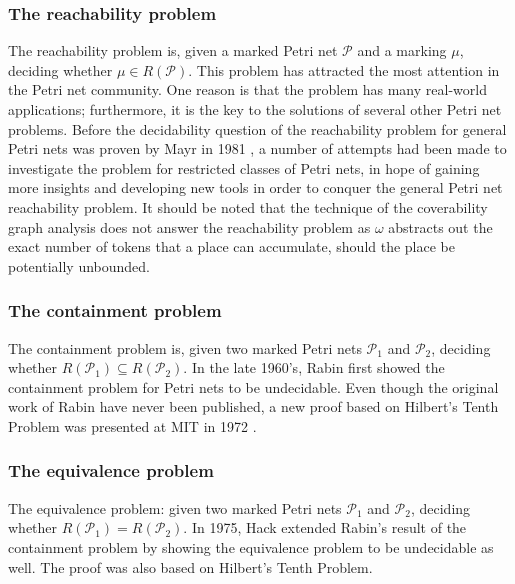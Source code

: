 \subsubsection{The reachability problem} %
\label{ssub:the_reachability_problem}
  The  reachability problem is, given a marked Petri net $\mathcal P$ and a marking $\mu$, deciding whether $\mu\in R(\mathcal P)$. This problem has attracted the most attention in the Petri net community. One reason is that the problem has many real-world applications; furthermore, it is the key to the solutions of several other Petri net problems. Before the decidability question of the reachability problem for general Petri nets was proven by Mayr in 1981 \cite{Mayr81PetriNetReachability}, a number of attempts had been made to investigate the problem for restricted classes of Petri nets, in hope of gaining more insights and developing new tools in order to conquer the general Petri net reachability problem. It should be noted that the technique of the coverability graph analysis does not answer the reachability problem as $\omega$ abstracts out the exact number of tokens that a place can accumulate, should the place be potentially unbounded.

\subsubsection{The containment problem} %
\label{ssub:the_containment_problem}
  The containment problem is, given two marked Petri nets $\mathcal P_1$ and $\mathcal P_2$, deciding whether $R(\mathcal P_1)\subseteq R(\mathcal P_2)$. In the late 1960's, Rabin first showed the containment problem for Petri nets to be undecidable. Even though the original work of Rabin have never been published, a new proof based on Hilbert's Tenth Problem \cite{Davis73Hilbert} was presented at MIT in 1972 \cite{Baker73PetriNetContainment}.

\subsubsection{The equivalence problem} %
\label{ssub:the_equivalence_problem}
  The equivalence problem: given two marked Petri nets $\mathcal P_1$ and $\mathcal P_2$, deciding whether $R(\mathcal P_1) = R(\mathcal P_2)$. In 1975, Hack \cite{Hack1976PetriNetEquivalence} extended Rabin's result of the containment problem by showing the equivalence problem to be undecidable as well. The proof was also based on Hilbert's Tenth Problem.

